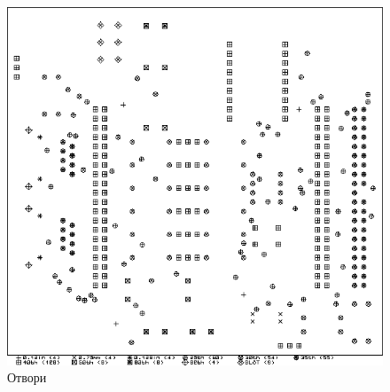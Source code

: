 \begin{figure}[!htbp]
    \centering
    \includegraphics[page=1]{documents/main_board_drill.pdf}
    \caption{Отвори}
    \label{fig:main_drill}
\end{figure}
\FloatBarrier